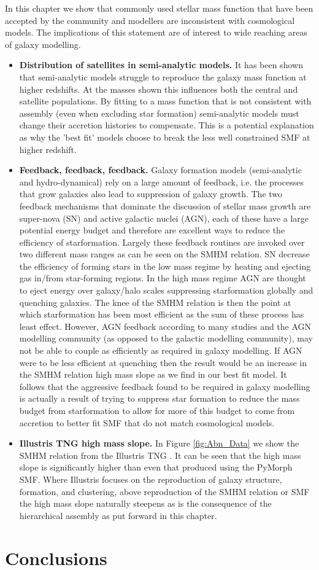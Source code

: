 In this chapter we show that commonly used stellar mass function that have been accepted by the community and modellers are inconsistent with \LCDM cosmological models. The implications of this statement are of interest to wide reaching areas of galaxy modelling. 
\begin{itemize}
    \item \textbf{Distribution of satellites in semi-analytic models.} It has been shown \citep[e.g.][]{Asquith2018CosmicModels} that semi-analytic models struggle to reproduce the galaxy mass function at higher redshifts. At the masses shown this influences both the central and satellite populations. By fitting to a mass function that is not consistent with \LCDM assembly (even when excluding star formation) semi-analytic models must change their accretion histories to compensate. This is a potential explanation as why the 'best fit' models choose to break the less well constrained SMF at higher redshift.
    \item \textbf{Feedback, feedback, feedback.} Galaxy formation models (semi-analytic and hydro-dynamical) rely on a large amount of feedback, i.e. the processes that grow galaxies also lead to suppression of galaxy growth. The two feedback mechanisms that dominate the discussion of stellar mass growth are super-nova (SN) and active galactic nuclei (AGN), each of these have a large potential energy budget and therefore are excellent ways to reduce the efficiency of starformation. Largely these feedback routines are invoked over two different mass ranges as can be seen on the SMHM relation. SN decrease the efficiency of forming stars in the low mass regime by heating and ejecting gas in/from star-forming regions. In the high mass regime AGN are thought to eject energy over galaxy/halo scales suppressing starformation globally and quenching galaxies. The knee of the SMHM relation is then the point at which starformation has been most efficient as the sum of these process has least effect. However, AGN feedback according to many studies and the AGN modelling community (as opposed to the galactic modelling community), may not be able to couple as efficiently as required in galaxy modelling. If AGN were to be less efficient at quenching then the result would be an increase in the SMHM relation high mass slope as we find in our best fit model. It follows that the aggressive feedback found to be required in galaxy modelling is actually a result of trying to suppress star formation to reduce the mass budget from starformation to allow for more of this budget to come from accretion to better fit SMF that do not match cosmological models.
    \item \textbf{Illustris TNG high mass slope.} In Figure \ref{fig:Abn_Data} we show the SMHM relation from the Illustris TNG \citep{Nelson2018TheRelease}. It can be seen that the high mass slope is significantly higher than even that produced using the PyMorph SMF. Where Illustris focuses on the reproduction of galaxy structure, formation, and clustering, above reproduction of the SMHM relation or SMF the high mass slope naturally steepens as is the consequence of the hierarchical assembly as put forward in this chapter.
\end{itemize}


\section{Conclusions}
